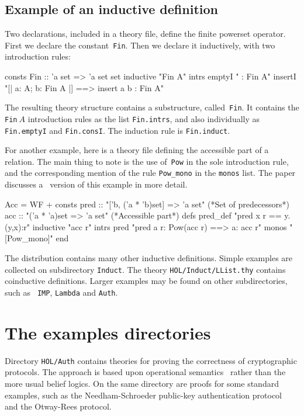 \subsection{Example of an inductive definition}
Two declarations, included in a theory file, define the finite powerset
operator.  First we declare the constant~{\tt Fin}.  Then we declare it
inductively, with two introduction rules:
\begin{ttbox}
consts Fin :: 'a set => 'a set set
inductive "Fin A"
  intrs
    emptyI  "{\ttlbrace}{\ttrbrace} : Fin A"
    insertI "[| a: A;  b: Fin A |] ==> insert a b : Fin A"
\end{ttbox}
The resulting theory structure contains a substructure, called~{\tt Fin}.
It contains the \texttt{Fin}$~A$ introduction rules as the list \texttt{Fin.intrs},
and also individually as \texttt{Fin.emptyI} and \texttt{Fin.consI}.  The induction
rule is \texttt{Fin.induct}.

For another example, here is a theory file defining the accessible
part of a relation.  The main thing to note is the use of~{\tt Pow} in
the sole introduction rule, and the corresponding mention of the rule
\verb|Pow_mono| in the \texttt{monos} list.  The paper
\cite{paulson-CADE} discusses a \ZF\ version of this example in more
detail.
\begin{ttbox}
Acc = WF + 
consts pred :: "['b, ('a * 'b)set] => 'a set"   (*Set of predecessors*)
       acc  :: "('a * 'a)set => 'a set"         (*Accessible part*)
defs   pred_def  "pred x r == {y. (y,x):r}"
inductive "acc r"
  intrs
     pred "pred a r: Pow(acc r) ==> a: acc r"
  monos   "[Pow_mono]"
end
\end{ttbox}
The \HOL{} distribution contains many other inductive definitions.
Simple examples are collected on subdirectory \texttt{Induct}.  The
theory \texttt{HOL/Induct/LList.thy} contains coinductive definitions.
Larger examples may be found on other subdirectories, such as {\tt
  IMP}, \texttt{Lambda} and \texttt{Auth}.

 


\section{The examples directories}

Directory \texttt{HOL/Auth} contains theories for proving the correctness of 
cryptographic protocols.  The approach is based upon operational 
semantics~\cite{paulson-security} rather than the more usual belief logics.
On the same directory are proofs for some standard examples, such as the 
Needham-Schroeder public-key authentication protocol~\cite{paulson-ns} 
and the Otway-Rees protocol.

